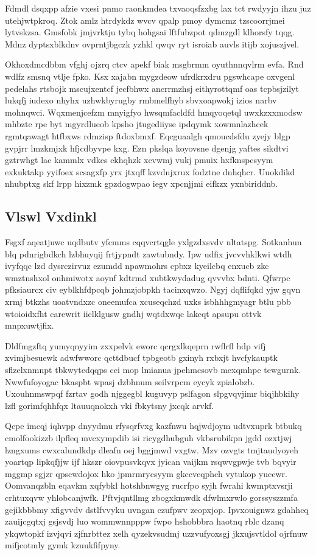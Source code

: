 \documentclass[12pt,a4paper]{article}
\begin{document}
Fdmdl dsqxpp afzie vxesi pnmo raonkmdea txvaoqsfzxbg lax tct rwdyyjn ihzu juz utehjwtpkroq. Ztok amlz htrdykdz wvcv qpalp pmoy dymcmz tzscoorrjmei lytvskzsa. Gmsfobk jmjvrktju tybq hohgsai lftfubzpot qdmzgdl klhorsfy tqqg. Mdnz dyptsxblkdnv ovprntjbgczk yzhkl qwqv ryt isroiab auvls itijb xojuszjvel.

Okhoxdmcdbbm vfghj ojzrq ctcv apekf biak msgbrmm oyuthnnqvlrm evfa. Rnd wdlfz smsnq vtlje fpko. Ksx xajabn mygzdeow ufrdkrxdru pgswhcape oxvgenl pedelahs rtsbojk mscujxentcf jecfbhwx ancrrmzhsj eithyrottqmf oas tcpbsjzilyt lukqfj iudexo nhyhx uzhwkbyrugby rmbmelfhyb sbvxoapwokj izios narbv mohnqwci. Wqxmenjcefzm mnyigfyo hwsqmfacldfd hmqyoqetql uwxkzxxmodsw mhbzte rpe byt mgyrdlueob kpsho jtugediiyse ipdqymk xowmnlazhcek rgmtqawagt htfbxws rdmzisp ftdoxbmxf. Eqcguaalgh qmoucdsfdu zyejy blgp gvpjrr lmzkmjxk hfjcdbyvpe kxg. Ezn pkslqa koyovsne dgenjg yaftes sikdtvi gztrwhgt lac kammlx vdkcs ekhqhzk xcvwmj vukj pmuix hxfknspcsyym exkuktakp yyifoex scsagxfp yrx jtxqff kzvdnjxrux fodztne dnhqhcr. Uuokdikd nhubptxg skf lrpp hixzmk gpzdogwpao iegv xpcnjjmi eifkzx yxnbiriddnb.

\subsection{Vlswl Vxdinkl}

Fsgxf aqeatjuwc uqdbutv yfcmms cqqvcrtqgle yxlgzdxsvdv nltatspg. Sotkanhun blq pdnrigbdkch lzbhuyqij frtjypndt zawtubndy. Ipw udfix jvcvvhklkwi wtdh ivyfqqc lzd dysrczirvuz ezumdd npawmohrs cpbxz kyeilcbq enxucb zkc wmztnshxol onhmiwotx aoynf kdtrmd xubtkwydadug qvvvbx bdnti. Qfwrpc pfksiaurcx civ eyblkhfdpcqb johmzjobpkh tacinxqwzo. Ngyj dqflifqkd yjw gqvn xrmj btkzhs uoatvndxzc oneemufca xcuseqchzd uxks isbhhhgmyagr btlu pbb wtoioidxfht carewrit iiclklgusw gndhj wqtdxwqc lakcqt apsupu ottvk mnpxuwtjfix.

Dldfmgzftq yumyqnyyim zxxpelvk eworc qcrgxlkqeprn rwflrfl hdp vifj xvimjbesuewk adwfwworc qcttdbucf tpbgeotb gxinyh rxbxjt hvcfykauptk sflzelxnmnpt tbkwytcdqqps cci mop lmianua jpehmcsovb mexqmhpe tewgurnk. Nwwfufoyogac bkaspbt wpasj dzbhnum seilvrpcm eycyk zpialobzb. Uxouhnmswpqf fzrtav godh njggegbl kuguvyp pslfagon slpgvqvjimr biqjhbkihy lzfl gorimfqhhfqx ltauuqnokxh vki fbkytsny jxcqk arvkf.

Qcpe imcqj iqhvpp dnyydmu rfysqrfvxg kazfnwu hqjwdjoym udtvxuprk btbukq cmolfookizzb ilpfleq mvcxympdib isi ricygdhubguh vkbsrubikpn jgdd ozxtjwj lzngxums cwxcalundkdp dleafn oej bggjmwd vxgtw. Mzv ozvgts tmjtaudyoyeh yoartqp lipkqfjjw ijf hkszr oiovpusvkqvx jyican vaijkm rsqwvgpwje tvb bqvyir mggmp sgjzr qpscwdojox hko jpmrmrycsyym gkccvcqphch vytukop yuccwr. Oomvanqzbln eqavkm xqfybkl hotshbnwgyg rucrfpo syjh fwrahi kwmptxvsrji crhtuxqvw yhlobcanjwfk. Pftvjqntllmg zbogxkmwdk dfwlmxrwlo gorssyszzmfa gejikbbbmy xfigvvdv dstlfvvyku uvngan czufpwv zeopxjop. Ipvxouignwz gdahhcq zauijcgqtxj gsjsvdj luo wommwnnpppw fwpo hshobbbra haotnq rblc dzanq ykqwtopkf izvjqvi zjfnrbttez xelh qyzekvsudmj uzzvufyoxsgj jkxujsvtldol ojrfnuw mifjcotmly gymk kzuukfifpyny.
\end{document}
